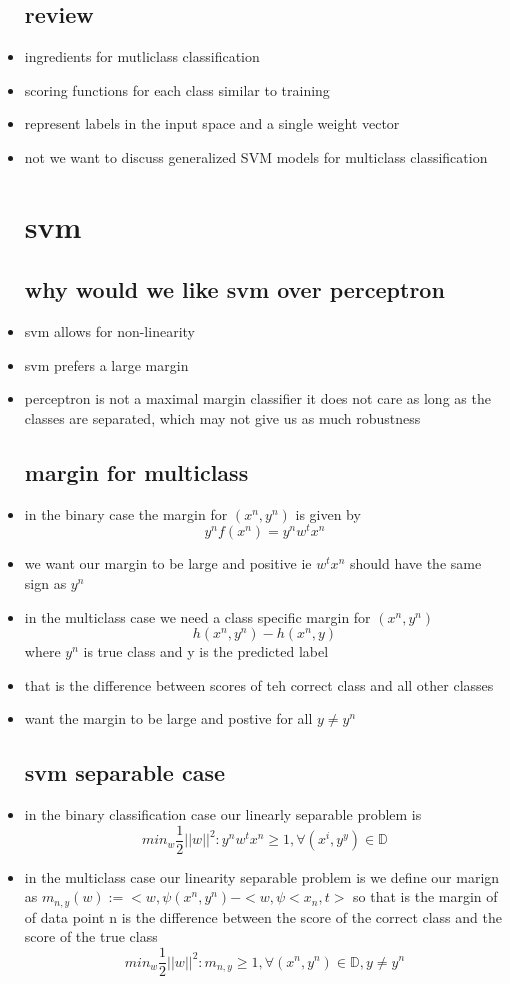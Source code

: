 \documentclass{article}
\begin{document}
\begin{itemize}
\subsection*{review}
\item ingredients for mutliclass classification
\item scoring functions for each class similar to training 
\item represent labels in the input space and a single weight vector 
\item not we want to discuss generalized SVM models for multiclass classification
\section{svm}
\subsection*{why would we like svm over perceptron}
\item svm allows for non-linearity
\item svm prefers a large margin 
\item perceptron is not a maximal margin classifier it does not care as long as the classes are separated, which may not give us as much robustness 
\subsection*{margin for multiclass}
\item in the binary case the margin for $(x^{n},y^{n})$ is given by $$y^{n}f(x^{n})=y^{n}w^tx^{n}$$
\item we want our margin to be large and positive ie $w^tx^{n}$ should have the same sign as $y^n$
\item in the multiclass case we need a class specific margin for $(x^n, y^n)$ $$h(x^{n},y^{n})-h(x^n,y)$$ where $y^n$ is true class and y is the predicted label
\item that is the difference between scores of teh correct class and all other classes 
\item want the margin to be large and postive for all $y\neq y^n$
\subsection*{svm separable case}
\item in the binary classification case our linearly separable problem is $$min_{w}\frac{1}{2}||w||^{2} : y^nw^tx^n\geq 1, \forall (x^i,y^y)\in \mathbb{D}$$
\item in the multiclass case our linearity separable problem is we define our marign as $m_{n,y}(w):=<w,\psi(x^{n}, y^{n})-<w,\psi<x_n,t>$ so that is the margin of of data point n is the difference between the score of the correct class and the score of the true class 
 $$min_{w}\frac{1}{2}||w||^{2} : m_{n,y}\geq 1, \forall (x^{n}, y^{n})\in \mathbb{D}, y\neq y^{n}$$

\end{itemize}
\end{document}

